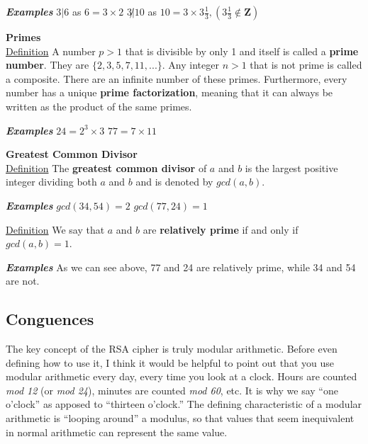 \documentclass{article}
\begin{document}
            \textbf{\textit{Examples}}
            \hspace*{\fill}    
                 {$3|6$ as $6=3\times2$} \hfill {$3\not|10$ as $10=3\times3\frac{1}{3},(3\frac{1}{3}\not\in\mathbf{Z})$}
            \hspace*{\fill}
            
            \noindent\textbf{Primes}\\
            \underline{Definition} A number $p>1$ that is divisible by only 1 and itself is called a \textbf{prime number}.  They are $\{2,3,5,7,11,...\}$.  Any integer $n>1$ that is not prime is called a composite.  There are an infinite number of these primes.  
            Furthermore, every number has a unique \textbf{prime factorization}, meaning that it can always be written as the product of the same primes.
            
            \textbf{\textit{Examples}}
            \hspace*{\fill}
	            {$24=2^{3}\times3$} \hfill {$77=7\times11 $}
            \hspace*{\fill}
            
            \noindent\textbf{Greatest Common Divisor}\\
            \underline{Definition} The \textbf{greatest common divisor} of $a$ and $b$ is the largest positive integer dividing both $a$ and $b$ and is denoted by $gcd(a,b)$.
            
            \textbf{\textit{Examples}}
            \hspace*{\fill}
	            {$gcd(34,54)=2$} \hfill {$gcd(77,24)=1$}
            \hspace*{\fill}
            
            \noindent\underline{Definition} We say that $a$ and $b$ are \textbf{relatively prime} if and only if $gcd(a,b)=1$.
            
            \textbf{\textit{Examples}} As we can see above, 77 and 24 are relatively prime, while 34 and 54 are not.
        \subsection{Conguences}
	        The key concept of the RSA cipher is truly modular arithmetic.  
	        Before even defining how to use it, I think it would be helpful to point out that you use modular arithmetic every day, every time you look at a clock.
	        Hours are counted \textit{mod 12} (or \textit{mod 24}), minutes are counted \textit{mod 60}, etc.  
	        It is why we say ``one o'clock'' as apposed to ``thirteen o'clock.''
	        The defining characteristic of a modular arithmetic is ``looping around'' a modulus, so that values that seem inequivalent in normal arithmetic can represent the same value.
	        
\end{document}
